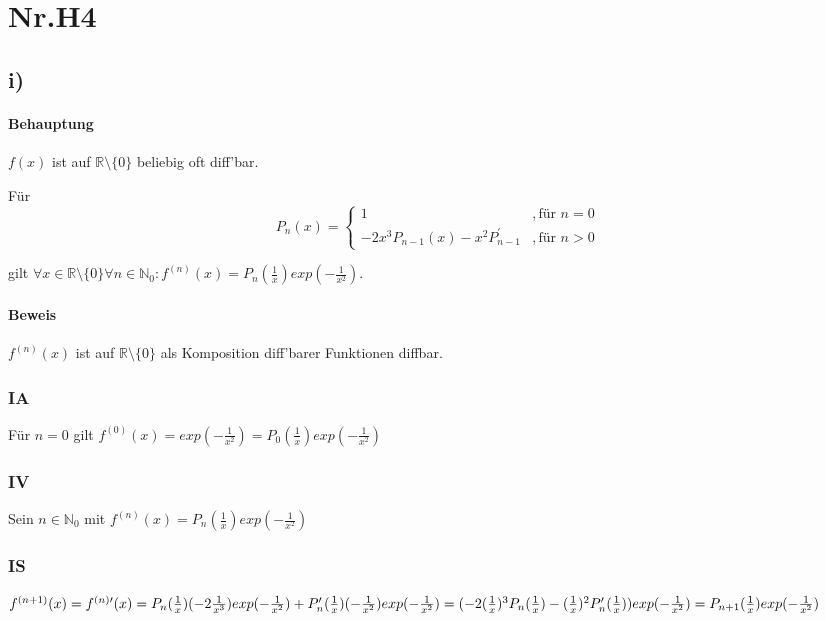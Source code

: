 \section*{Nr.H4}

\subsection*{i)}

\paragraph*{Behauptung}

$f(x)$ ist auf $\mathbb{R} \setminus \{0\}$ beliebig oft diff'bar.
	
Für
	\[ P_{n}(x) = 
		\begin{cases} 
			1                                         &, \text{für } n = 0 \\
			-2x^{3}P_{n-1}(x)-x^{2}P^{\prime}_{n-1}   &, \text{für } n > 0 
		\end{cases} 
	\]
	
gilt $\forall x \in \mathbb{R} \setminus \{0\} \forall n \in \mathbb{N}_{0} : 
	f^{(n)}(x)= P_{n}(\frac{1}{x})exp(- \frac{1}{x^{2}})$.

\paragraph*{Beweis}

$f^{(n)}(x)$ ist auf $\mathbb{R} \setminus \{0\}$ als Komposition diff'barer Funktionen diffbar.

\subsubsection*{IA}
	
Für $n = 0$ gilt $f^{(0)}(x) = exp(- \frac{1}{x^{2}}) = P_{0}(\frac{1}{x})exp(- \frac{1}{x^{2}})$

\subsubsection*{IV}

Sein $n \in \mathbb{N}_{0}$ mit $f^{(n)}(x)= P_{n}(\frac{1}{x})exp(- \frac{1}{x^{2}})$

\subsubsection*{IS}

$f^{(n+1)}(x) = f^{(n)\prime}(x)\\
	= P_{n}(\frac{1}{x})(-2\frac{1}{x^{3}})exp(- \frac{1}{x^{2}}) 
		+ P^{\prime}_{n}(\frac{1}{x})(-\frac{1}{x^{2}})exp(- \frac{1}{x^{2}}) \\
	= (-2(\frac{1}{x})^{3}P_{n}(\frac{1}{x})
		 -(\frac{1}{x})^{2}P^{\prime}_{n}(\frac{1}{x}))exp(- \frac{1}{x^{2}}) \\
	= P_{n+1}(\frac{1}{x})exp(- \frac{1}{x^{2}})$ 
	
